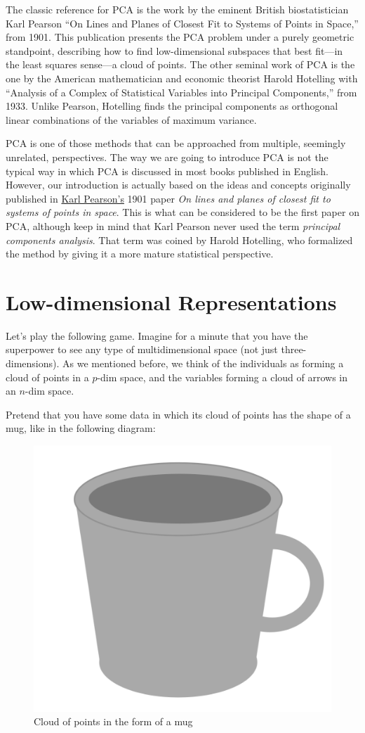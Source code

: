 \documentclass[]{book}
\begin{document}
The classic reference for PCA is the work by the eminent British biostatistician
Karl Pearson ``On Lines and Planes of Closest Fit to Systems of Points in Space,''
from 1901. This publication presents the PCA problem under a purely geometric
standpoint, describing how to find low-dimensional subspaces that best
fit---in the least squares sense---a cloud of points. The other seminal work of
PCA is the one by the American mathematician and economic theorist Harold Hotelling
with ``Analysis of a Complex of Statistical Variables into Principal Components,''
from 1933. Unlike Pearson, Hotelling finds the principal components as
orthogonal linear combinations of the variables of maximum variance.

PCA is one of those methods that can be approached from multiple, seemingly
unrelated, perspectives. The way we are going to introduce PCA is not the typical
way in which PCA is discussed in most books published in English. However, our
introduction is actually based on the ideas and concepts originally published
in \href{https://en.wikipedia.org/wiki/Karl_Pearson}{Karl Pearson's} 1901 paper
\emph{On lines and planes of closest fit to systems of points in space}. This is what
can be considered to be the first paper on PCA, although keep in mind that
Karl Pearson never used the term \emph{principal components analysis}. That term was
coined by Harold Hotelling, who formalized the method by giving it a more
mature statistical perspective.

\hypertarget{low-dimensional-representations}{%
\section{Low-dimensional Representations}\label{low-dimensional-representations}}

Let's play the following game. Imagine for a minute that you have the superpower
to see any type of multidimensional space (not just three-dimensions). As we
mentioned before, we think of the individuals as forming a cloud of points in a
\(p\)-dim space, and the variables forming a cloud of arrows in an \(n\)-dim space.

Pretend that you have some data in which its cloud of points has the shape of
a mug, like in the following diagram:

\begin{figure}

{\centering \includegraphics[width=0.4\linewidth]{images/pca/mug-data} 

}

\caption{Cloud of points in the form of a mug}\label{fig:unnamed-chunk-24}
\end{figure}
\end{document}
